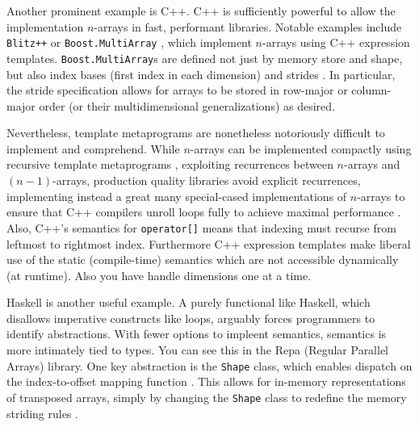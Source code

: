 \documentclass[preprint]{sigplanconf}
\newcommand{\code}[1]{\texttt{#1}}
\begin{document}
\begin{enumerate}
Another prominent example is C++. C++ is sufficiently powerful to allow the
implementation $n$-arrays in fast, performant libraries. Notable examples
include \code{Blitz++} \cite{Veldhuizen:1998ab} or \code{Boost.MultiArray}
\cite{Garcia:2005ma}, which implement $n$-arrays using C++ expression
templates. \code{Boost.MultiArray}s are defined not just by memory store and
shape, but also index bases (first index in each dimension) and strides
\cite{Garcia:2005ma}. In particular, the stride specification allows for
arrays to be stored in row-major or column-major order (or their
multidimensional generalizations) as desired.

Nevertheless, template metaprograms are nonetheless notoriously difficult to
implement and comprehend. While $n$-arrays can be implemented compactly using
recursive template metaprograms \cite{Bavestrelli:2000ct}, exploiting
recurrences between $n$-arrays and $(n-1)$-arrays, production quality
libraries avoid explicit recurrences, implementing instead a great many
special-cased implementations of $n$-arrays to ensure that C++ compilers
unroll loops fully to achieve maximal performance \cite{Garcia:2005ma}. Also,
C++'s semantics for \code{operator[]} means that indexing must recurse from
leftmost to rightmost index. Furthermore C++ expression templates make liberal
use of the static (compile-time) semantics which are not accessible
dynamically (at runtime). Also you have handle dimensions one at a time.




Haskell is another useful example. A purely functional like Haskell, which
disallows imperative constructs like loops, arguably forces programmers to
identify abstractions. With fewer options to impleent semantics, semantics is
more intimately tied to types. You can see this in the Repa (Regular Parallel
Arrays) library. One key abstraction is the \code{Shape} class, which enables
dispatch on the index-to-offset mapping function \cite{Keller:2010rs}. This
allows for in-memory representations of transposed arrays, simply by changing
the \code{Shape} class to redefine the memory striding rules
\cite{Keller:2010rs}.


\end{enumerate}
\end{document}
